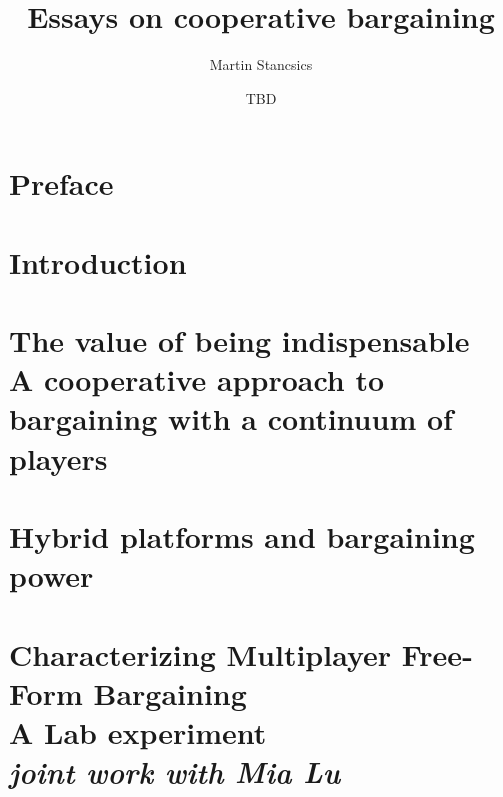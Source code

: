 \documentclass[a4paper,11pt]{report}
\title{Essays on cooperative bargaining}
\author{Martin Stancsics}
\date{TBD}
\begin{document}




\chapter*{Preface}


\tableofcontents
{}

\chapter{Introduction}
\label{ch:introduction}
\setcounter{page}{1}



\chapter[The value of being indispensable]{%
    The value of being indispensable\\\vspace{0.4cm}%
    \large{A cooperative approach to bargaining with a continuum of players}%
}
\label{ch:theory}

\begin{subappendices}
    
\end{subappendices}

\chapter{Hybrid platforms and bargaining power}
\label{ch:application}

\begin{subappendices}
    
\end{subappendices}

\chapter[Characterizing Multiplayer Free-Form Bargaining]{%
    Characterizing Multiplayer Free-Form Bargaining\\\vspace{0.4cm}%
    \large{A Lab experiment}\\\vspace{0.2cm}%
    \large{\textit{joint work with Mia Lu}}%
}
\label{ch:experiment}

\begin{subappendices}
    
\end{subappendices}

\singlespacing

\printbibliography
\end{document}
